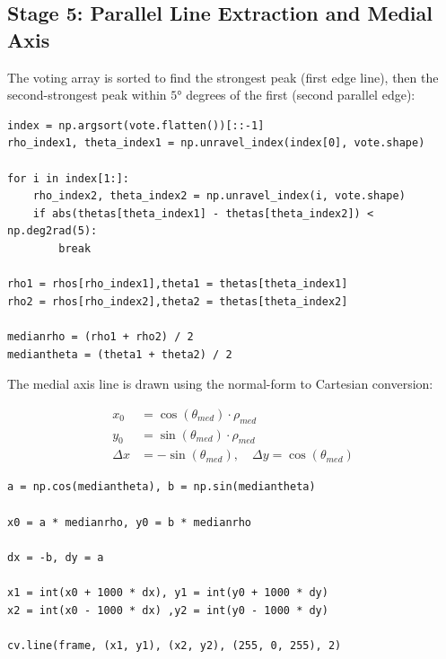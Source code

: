 \documentclass[journal]{IEEEtran}
\begin{document}
\subsection{Stage 5: Parallel Line Extraction and Medial Axis}
The voting array is sorted to find the strongest peak (first edge line), 
then the second-strongest peak within $5°$ degrees of the first (second parallel edge):

\begin{lstlisting}
index = np.argsort(vote.flatten())[::-1]
rho_index1, theta_index1 = np.unravel_index(index[0], vote.shape)
    
for i in index[1:]:
    rho_index2, theta_index2 = np.unravel_index(i, vote.shape)
    if abs(thetas[theta_index1] - thetas[theta_index2]) < np.deg2rad(5):
        break

rho1 = rhos[rho_index1],theta1 = thetas[theta_index1]
rho2 = rhos[rho_index2],theta2 = thetas[theta_index2]

medianrho = (rho1 + rho2) / 2
mediantheta = (theta1 + theta2) / 2

\end{lstlisting}

The medial axis line is drawn using the normal-form to Cartesian conversion:

\begin{align}
x_0 &= \cos(\theta_{med}) \cdot \rho_{med} \\
y_0 &= \sin(\theta_{med}) \cdot \rho_{med} \\
\Delta x &= -\sin(\theta_{med}), \quad \Delta y = \cos(\theta_{med})
\end{align}

\begin{lstlisting}
a = np.cos(mediantheta), b = np.sin(mediantheta)

x0 = a * medianrho, y0 = b * medianrho

dx = -b, dy = a

x1 = int(x0 + 1000 * dx), y1 = int(y0 + 1000 * dy)
x2 = int(x0 - 1000 * dx) ,y2 = int(y0 - 1000 * dy)

cv.line(frame, (x1, y1), (x2, y2), (255, 0, 255), 2)
\end{lstlisting}
\end{document}
